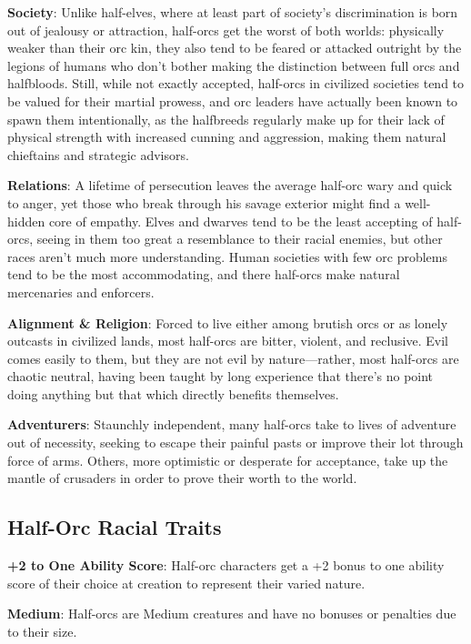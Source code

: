 \textbf{Society}: Unlike half-elves, where at least part of society's discrimination is born out of jealousy or attraction, half-orcs get the worst of both worlds: physically weaker than their orc kin, they also tend to be feared or attacked outright by the legions of humans who don't bother making the distinction between full orcs and halfbloods. Still, while not exactly accepted, half-orcs in civilized societies tend to be valued for their martial prowess, and orc leaders have actually been known to spawn them intentionally, as the halfbreeds regularly make up for their lack of physical strength with increased cunning and aggression, making them natural chieftains and strategic advisors. 
				
\textbf{Relations}: A lifetime of persecution leaves the average half-orc wary and quick to anger, yet those who break through his savage exterior might find a well-hidden core of empathy. Elves and dwarves tend to be the least accepting of half-orcs, seeing in them too great a resemblance to their racial enemies, but other races aren't much more understanding. Human societies with few orc problems tend to be the most accommodating, and there half-orcs make natural mercenaries and enforcers.
				
\textbf{Alignment \& Religion}: Forced to live either among brutish orcs or as lonely outcasts in civilized lands, most half-orcs are bitter, violent, and reclusive. Evil comes easily to them, but they are not evil by nature---rather, most half-orcs are chaotic neutral, having been taught by long experience that there's no point doing anything but that which directly benefits themselves.
				
\textbf{Adventurers}: Staunchly independent, many half-orcs take to lives of adventure out of necessity, seeking to escape their painful pasts or improve their lot through force of arms. Others, more optimistic or desperate for acceptance, take up the mantle of crusaders in order to prove their worth to the world.
							
\subsection{Half-Orc Racial Traits}

				
\textbf{+2 to One Ability Score}: Half-orc characters get a +2 bonus to one ability score of their choice at creation to represent their varied nature.
				
\textbf{Medium}: Half-orcs are Medium creatures and have no bonuses or penalties due to their size.
				
